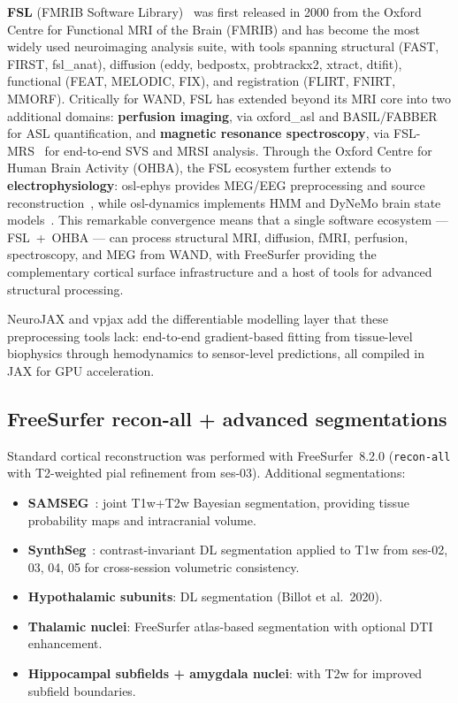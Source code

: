 \documentclass[11pt,a4paper]{article}\usepackage[]{graphicx}\usepackage[]{xcolor}
\begin{document}
\textbf{FSL} (FMRIB Software Library)~\citep{Jenkinson2012fsl,Smith2004fsl}
was first released in 2000 from the Oxford Centre for Functional MRI of the
Brain (FMRIB) and has become the most widely used neuroimaging analysis
suite, with tools spanning structural (FAST, FIRST, fsl\_anat), diffusion
(eddy, bedpostx, probtrackx2, xtract, dtifit), functional (FEAT, MELODIC,
FIX), and registration (FLIRT, FNIRT, MMORF). Critically for WAND, FSL
has extended beyond its MRI core into two additional domains:
\textbf{perfusion imaging}, via oxford\_asl and
BASIL/FABBER~\citep{Chappell2009basil} for ASL quantification, and
\textbf{magnetic resonance spectroscopy}, via
FSL-MRS~\citep{Clarke2021fslmrs} for end-to-end SVS and MRSI analysis.
Through the Oxford Centre for Human Brain Activity (OHBA), the FSL
ecosystem further extends to \textbf{electrophysiology}: osl-ephys
provides MEG/EEG preprocessing and source
reconstruction~\citep{vanEs2025oslephys}, while osl-dynamics implements
HMM and DyNeMo brain state models~\citep{Gohil2023dynemo}. This
remarkable convergence means that a single software ecosystem ---
FSL~+~OHBA --- can process structural MRI, diffusion, fMRI, perfusion,
spectroscopy, and MEG from WAND, with FreeSurfer providing the
complementary cortical surface infrastructure and a host of tools for
advanced structural processing.

NeuroJAX and vpjax add the differentiable modelling layer that these
preprocessing tools lack: end-to-end gradient-based fitting from
tissue-level biophysics through hemodynamics to sensor-level
predictions, all compiled in JAX for GPU acceleration.

\subsection{FreeSurfer recon-all + advanced segmentations}

Standard cortical reconstruction was performed with FreeSurfer~8.2.0
(\texttt{recon-all} with T2-weighted pial refinement from ses-03).
Additional segmentations:
\begin{itemize}
  \item \textbf{SAMSEG}~\citep{Puonti2016samseg}: joint T1w+T2w Bayesian
        segmentation, providing tissue probability maps and intracranial volume.
  \item \textbf{SynthSeg}~\citep{Billot2023synthseg}: contrast-invariant DL
        segmentation applied to T1w from ses-02, 03, 04, 05 for cross-session
        volumetric consistency.
  \item \textbf{Hypothalamic subunits}: DL segmentation (Billot et al.\ 2020).
  \item \textbf{Thalamic nuclei}: FreeSurfer atlas-based segmentation with
        optional DTI enhancement.
  \item \textbf{Hippocampal subfields + amygdala nuclei}: with T2w for
        improved subfield boundaries.
\end{itemize}
\end{document}

